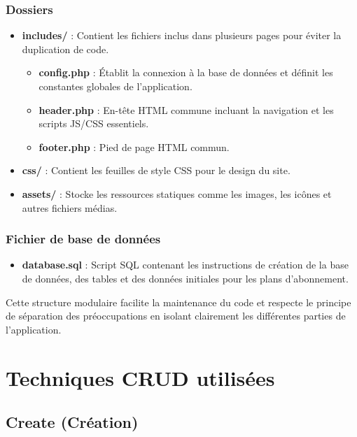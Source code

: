\documentclass[12pt,a4paper]{report}
\begin{document}
\subsection{Dossiers}
\begin{itemize}
    \item \textbf{includes/} : Contient les fichiers inclus dans plusieurs pages pour éviter la duplication de code.
    \begin{itemize}
        \item \textbf{config.php} : Établit la connexion à la base de données et définit les constantes globales de l'application.
        \item \textbf{header.php} : En-tête HTML commune incluant la navigation et les scripts JS/CSS essentiels.
        \item \textbf{footer.php} : Pied de page HTML commun.
    \end{itemize}
    
    \item \textbf{css/} : Contient les feuilles de style CSS pour le design du site.
    
    \item \textbf{assets/} : Stocke les ressources statiques comme les images, les icônes et autres fichiers médias.
\end{itemize}

\subsection{Fichier de base de données}
\begin{itemize}
    \item \textbf{database.sql} : Script SQL contenant les instructions de création de la base de données, des tables et des données initiales pour les plans d'abonnement.
\end{itemize}

Cette structure modulaire facilite la maintenance du code et respecte le principe de séparation des préoccupations en isolant clairement les différentes parties de l'application. 

\chapter{Techniques CRUD utilisées}

\section{Create (Création)}
\end{document}
